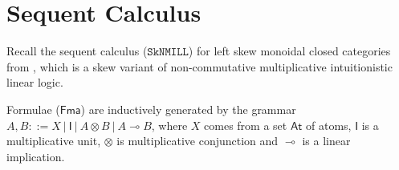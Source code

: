 \documentclass[sn-mathphys-num]{sn-jnl}%
\newcommand{\GG}{\Gamma}
\newcommand{\vd}{\vdash}
\newcommand{\ot}{\otimes}
\newcommand{\lolli}{\multimap}
\newcommand{\I}{\mathsf{I}}
\newcommand{\SkNMILL}{$\mathtt{SkNMILL}$}
\newcommand{\LSkT}{$\mathtt{LSkT}$}
\newcommand{\SkBiCT}{$\mathtt{SkBiCT}$}
\newcommand{\SkBiCA}{$\mathtt{SkBiCA}$}
\newcommand{\mf}[1]{\mathsf{#1}}
\theoremstyle{thmstyleone}%
\theoremstyle{thmstyletwo}%
\theoremstyle{thmstylethree}%
\begin{document}



\section{Sequent Calculus}\label{sec:syntax}
Recall the sequent calculus (\SkNMILL) for left skew monoidal closed categories from \cite{UVW:protsn}, which is a skew variant of non-commutative multiplicative intuitionistic linear logic.

Formulae ($\mf{Fma}$) are inductively generated by the grammar $A, B::= X \ | \ \I \ | \ A \ot B \ | \ A \lolli B$, where $X$ comes from a set $\mathsf{At}$ of atoms, $\I$ is a multiplicative unit, $\ot$ is multiplicative conjunction and $\lolli$ is a linear implication.
\end{document}

